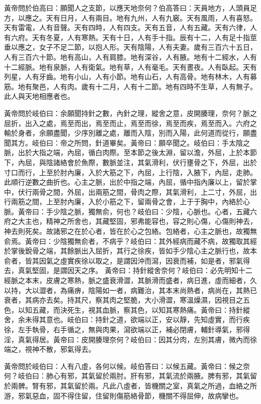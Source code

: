 黃帝問於伯高曰：願聞人之支節，以應天地奈何？伯高答曰：天員地方，人頭員足方，以應之。天有日月，人有兩目。地有九州，人有九竅。天有風雨，人有喜怒。天有雷電，人有音聲。天有四時，人有四支。天有五音，人有五藏。天有六律，人有六府。天有冬夏，人有寒熱。天有十日，人有手十指。辰有十二，人有足十指莖垂以應之，女子不足二節，以抱人形。天有陰陽，人有夫妻。歲有三百六十五日，人有三百六十節。地有高山，人有肩膝。地有深谷，人有腋。地有十二經水，人有十二經脈。地有泉脈，人有衛氣。地有草，人有毫毛。天有晝夜。人有臥起。天有列星，人有牙齒。地有小山，人有小節。地有山石，人有高骨。地有林木，人有募筋。地有聚邑，人有肉。歲有十二月，人有十二節。地有四時不生草，人有無子。此人與天地相應者也。

黃帝問於岐伯曰：余願聞持針之數，內針之理，縱舍之意，皮開腠理，奈何？脈之屈折，出入之處，焉至而出，焉至而止，焉至而徐，焉至而疾，焉至而入。六府之輸於身者，余願盡聞，少序別離之處，離而入陰，別而入陽，此何道而從行，願盡聞其方。岐伯曰：帝之所問，針道畢矣。黃帝曰：願卒聞之。岐伯曰：手太陰之脈，出於大指之端，內屈，循白肉際。至本節之後太淵，留以澹，外屈，上於本節下，內屈，與陰諸絡會於魚際，數脈並注，其氣滑利，伏行壅骨之下，外屈，出於寸口而行，上至於肘內廉，入於大筋之下，內屈，上行陰，入腋下，內屈，走肺。此順行逆數之曲折也。心主之脈，出於中指之端，內屈，循中指內廉以上，留於掌中，伏行兩骨之間，外屈，出兩筋之間，骨肉之際，其氣滑利，上二寸，外屈，出行兩筋之間，上至肘內廉，入於小筋之下，留兩骨之會，上于于胸中，內絡於心脈。黃帝曰：手少陰之脈，獨無俞，何也？岐伯曰：少陰，心脈也。心者，五藏六府之大主也，精神之所舍也，其藏堅固，邪弗能容也，容之則心傷，心傷則神去，神去則死矣。故諸邪之在於心者，皆在於心之包絡。包絡者，心主之脈也，故獨無俞焉。黃帝曰：少陰獨無俞者，不病乎？岐伯曰：其外經病而藏不病，故獨取其經於掌後銳骨之端，其餘脈出入屈折，其行之徐疾，皆如手少陰心主之脈行也，故本俞者，皆其因氣之虛實疾徐以取之，是謂因沖而瀉，因衰而補，如是者，邪氣得去，真氣堅固，是謂因天之序。
黃帝曰：持針縱舍奈何？岐伯曰：必先明知十二經脈之本末，皮膚之寒熱，脈之盛衰滑澀，其脈滑而盛者，病日進，虛而細者，久以持，大以澀者，為痛痹，陰陽如一者，病難治，其本末尚熱者，病尚在，其熱已衰者，其病亦去矣。持其尺，察其肉之堅脆，大小滑澀，寒溫燥濕，因視目之五色，以知五藏，而決死生，視其血脈，察其色，以知其寒熱痛。黃帝曰：持針縱舍，余未得其意也。岐伯曰：持針之道，欲端以正，安以靜，先知虛實，而行疾徐，左手執骨，右手循之，無與肉果，瀉欲端以正，補必閉膚，輔針導氣，邪得淫，真氣得居。黃帝曰：皮開腠理奈何？岐伯曰：因其分肉，左別其膚，微內而徐端之，視神不散，邪氣得去。

黃帝問於岐伯曰：人有八虛，各何以候。岐伯答曰：以候五藏。黃帝曰：候之奈何？岐伯曰：肺心有邪，其氣留於兩肘。肝有邪，其氣流於兩腋。脾有邪，其氣留於兩髀。腎有邪，其氣留於兩。凡此八虛者，皆機關之室，真氣之所過，血絡之所游，邪氣惡血，固不得住留，住留則傷筋絡骨節，機關不得屈伸，故病攣也。



